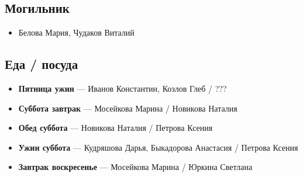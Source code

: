 \subsection*{Могильник}
\begin{itemize}
\item Белова Мария, Чудаков Виталий
\end{itemize}

\subsection*{Еда / посуда}
\begin{itemize}
\item \textbf{Пятница ужин} --- Иванов Константин, Козлов Глеб / ???
\item \textbf{Суббота завтрак} --- Мосейкова Марина / Новикова Наталия
\item \textbf{Обед суббота} --- Новикова Наталия / Петрова Ксения 
\item \textbf{Ужин суббота} --- Кудряшова Дарья, Быкадорова Анастасия / Петрова Ксения 
\item \textbf{Завтрак воскресенье} --- Мосейкова Марина / Юркина Светлана
\end{itemize}